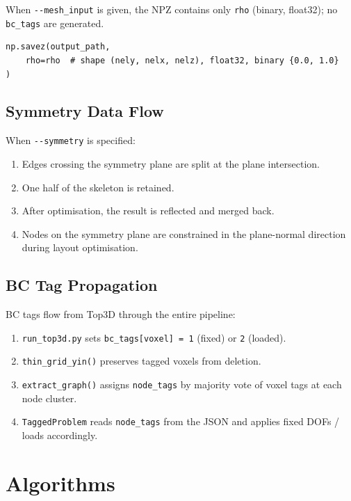 \documentclass[a4paper, 11pt, openany]{report}
\begin{document}
When \texttt{-{}-mesh\_input} is given, the NPZ contains only \texttt{rho}
(binary, float32); no \texttt{bc\_tags} are generated.

\begin{lstlisting}[style=pythonstyle]
np.savez(output_path,
    rho=rho  # shape (nely, nelx, nelz), float32, binary {0.0, 1.0}
)
\end{lstlisting}


\subsection{Symmetry Data Flow}

When \texttt{-{}-symmetry} is specified:
\begin{enumerate}[nosep]
    \item Edges crossing the symmetry plane are split at the plane intersection.
    \item One half of the skeleton is retained.
    \item After optimisation, the result is reflected and merged back.
    \item Nodes on the symmetry plane are constrained in the plane-normal
          direction during layout optimisation.
\end{enumerate}


\subsection{BC Tag Propagation}

BC tags flow from Top3D through the entire pipeline:
\begin{enumerate}[nosep]
    \item \texttt{run\_top3d.py} sets \texttt{bc\_tags[voxel] = 1} (fixed) or
          \texttt{2} (loaded).
    \item \texttt{thin\_grid\_yin()} preserves tagged voxels from deletion.
    \item \texttt{extract\_graph()} assigns \texttt{node\_tags} by majority vote
          of voxel tags at each node cluster.
    \item \texttt{TaggedProblem} reads \texttt{node\_tags} from the JSON and
          applies fixed DOFs / loads accordingly.
\end{enumerate}


\section{Algorithms}
\label{sec:algorithms}
\end{document}
